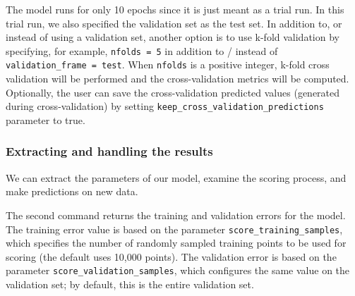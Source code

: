 %

\waterExampleInR


\waterExampleInPython



\noindent
The model runs for only 10 epochs since it is just meant  as a trial run. In this trial run, we also specified the validation set as the test set.  In addition to, or instead of using a validation set, another option is to use k-fold validation by specifying, for example, \texttt{nfolds = 5} in addition to / instead of \texttt{validation\_frame = test}.  When \texttt{nfolds} is a positive integer, k-fold cross validation will be performed and the cross-validation metrics will be computed.  Optionally, the user can save the cross-validation predicted values (generated during cross-validation) by setting \texttt{keep\_cross\_validation\_predictions} parameter to true.  

\subsubsection{Extracting and handling the results} 

We can extract the parameters of our model, examine the scoring process, and make predictions on new data.

\waterExampleInR


\waterExampleInPython




\noindent
The second command returns the training and validation errors for the model. The training error value is based on the parameter \texttt{score\_training\_samples}, which specifies the number of randomly sampled training points to be used for scoring (the default uses 10,000 points). The validation error is based on the parameter \texttt{score\_validation\_samples}, which configures the same value on the validation set; by default, this is the entire validation set.

